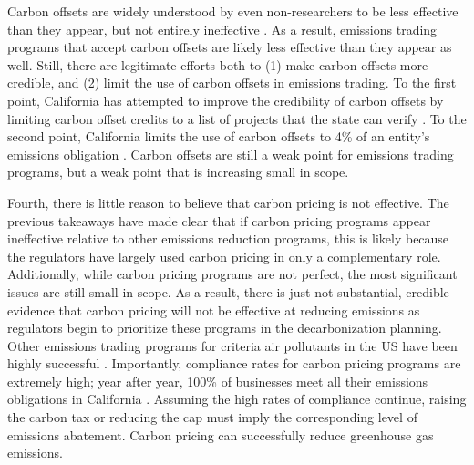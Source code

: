 Carbon offsets are widely understood by even non-researchers to be less effective than they appear, but not entirely ineffective \citep[see, for example,][]{astor2022airline}. As a result, emissions trading programs that accept carbon offsets are likely less effective than they appear as well. Still, there are legitimate efforts both to (1) make carbon offsets more credible, and (2) limit the use of carbon offsets in emissions trading. To the first point, California has attempted to improve the credibility of carbon offsets by limiting carbon offset credits to a list of projects that the state can verify \citep{carb_offsets}. To the second point, California limits the use of carbon offsets to 4\% of an entity's emissions obligation \citep{carb_offsets_about}. Carbon offsets are still a weak point for emissions trading programs, but a weak point that is increasing small in scope. 

Fourth, there is little reason to believe that carbon pricing is not effective. The previous takeaways have made clear that if carbon pricing programs appear ineffective relative to other emissions reduction programs, this is likely because the regulators have largely used carbon pricing in only a complementary role. Additionally, while carbon pricing programs are not perfect, the most significant issues are still small in scope. As a result, there is just not substantial, credible evidence that carbon pricing will not be effective at reducing emissions as regulators begin to prioritize these programs in the decarbonization planning. Other emissions trading programs for criteria air pollutants in the US have been highly successful \citep{schmalensee2017lessons}. Importantly, compliance rates for carbon pricing programs are extremely high; year after year, 100\% of businesses meet all their emissions obligations in California \citep{carb_comp_2018, carb_comp_2021}. Assuming the high rates of compliance continue, raising the carbon tax or reducing the cap must imply the corresponding level of emissions abatement. Carbon pricing can successfully reduce greenhouse gas emissions.


